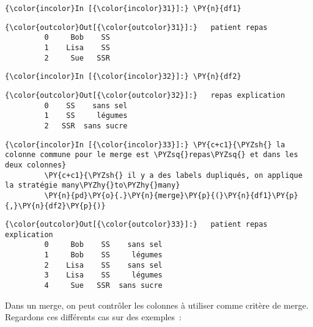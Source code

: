     \begin{Verbatim}[commandchars=\\\{\}]
{\color{incolor}In [{\color{incolor}31}]:} \PY{n}{df1}
\end{Verbatim}


\begin{Verbatim}[commandchars=\\\{\}]
{\color{outcolor}Out[{\color{outcolor}31}]:}   patient repas
         0     Bob    SS
         1    Lisa    SS
         2     Sue   SSR
\end{Verbatim}
            
    \begin{Verbatim}[commandchars=\\\{\}]
{\color{incolor}In [{\color{incolor}32}]:} \PY{n}{df2}
\end{Verbatim}


\begin{Verbatim}[commandchars=\\\{\}]
{\color{outcolor}Out[{\color{outcolor}32}]:}   repas explication
         0    SS    sans sel
         1    SS     légumes
         2   SSR  sans sucre
\end{Verbatim}
            
    \begin{Verbatim}[commandchars=\\\{\}]
{\color{incolor}In [{\color{incolor}33}]:} \PY{c+c1}{\PYZsh{} la colonne commune pour le merge est \PYZsq{}repas\PYZsq{} et dans les deux colonnes}
         \PY{c+c1}{\PYZsh{} il y a des labels dupliqués, on applique la stratégie many\PYZhy{}to\PYZhy{}many}
         \PY{n}{pd}\PY{o}{.}\PY{n}{merge}\PY{p}{(}\PY{n}{df1}\PY{p}{,}\PY{n}{df2}\PY{p}{)}
\end{Verbatim}


\begin{Verbatim}[commandchars=\\\{\}]
{\color{outcolor}Out[{\color{outcolor}33}]:}   patient repas explication
         0     Bob    SS    sans sel
         1     Bob    SS     légumes
         2    Lisa    SS    sans sel
         3    Lisa    SS     légumes
         4     Sue   SSR  sans sucre
\end{Verbatim}
            
    Dans un merge, on peut contrôler les colonnes à utiliser comme critère
de merge. Regardons ces différents cas sur des exemples~:

